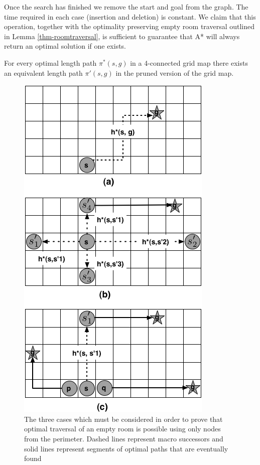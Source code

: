 Once the search has finished we remove the start and goal from the graph.
The time required in each case (insertion and deletion) is constant.
We claim that this operation, together with the optimality preserving empty
room traversal outlined in Lemma \ref{thm-roomtraversal}, is sufficient to guarantee
that A* will always return an optimal solution if one exists.

\begin{theorem}
For every optimal length path $\pi^*(s, g)$ in a 4-connected grid map there exists
an equivalent length path $\pi'(s, g)$ in the pruned version of the grid map.
\end{theorem}


\begin{figure}[htbp]
	\label{fig-roomtraversal}
	\vspace{-4pt}
       \begin{center}
           \includegraphics[scale=0.50, trim = 10mm 10mm 10mm 0mm]{diagrams/roomtraversal.png}
       \end{center}
	\vspace{-3pt}
       \caption{The three cases which must be considered in order to prove that 
			optimal traversal of an empty room is possible using only nodes from the perimeter.
			Dashed lines represent macro successors and solid lines represent segments of optimal
			paths that are eventually found}
       \label{fig-ohacontrast}
	\vspace{-15pt}
\end{figure}

